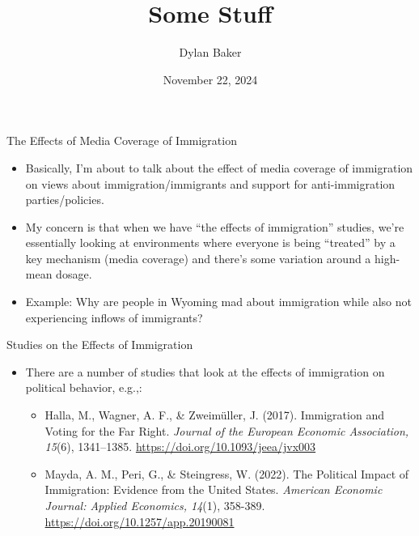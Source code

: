 \documentclass[12pt, aspectratio=169]{beamer}
\begin{document}
\title{Some Stuff}
\author{Dylan Baker}
\date{November 22, 2024}

\begin{frame} 

\maketitle

\end{frame}

\begin{frame}{The Effects of Media Coverage of Immigration}

    \begin{itemize}
        \item Basically, I'm about to talk about the effect of media coverage of immigration on 
            views about immigration/immigrants and support for anti-immigration parties/policies.
        \item My concern is that when we have ``the effects of immigration''
            studies, we're essentially looking at environments where everyone is
            being ``treated'' by a key mechanism (media coverage) and there's some variation around a high-mean dosage.
        \item Example: Why are people in Wyoming mad about immigration while also not experiencing inflows of immigrants?
    \end{itemize}
    
    
\end{frame}


\begin{frame}{Studies on the Effects of Immigration}

\begin{itemize}
\item There are a number of studies that look at the effects of immigration on 
    political behavior, e.g.,:
    \begin{itemize}
        \item Halla, M., Wagner, A. F., \& Zweimüller, J. (2017). Immigration and Voting for the Far Right. \emph{Journal of the European Economic Association, 15}(6), 1341–1385. \href{https://doi.org/10.1093/jeea/jvx003}{https://doi.org/10.1093/jeea/jvx003}
        \item Mayda, A. M., Peri, G., \& Steingress, W. (2022). The Political Impact of Immigration: Evidence from the United States. \emph{American Economic Journal: Applied Economics, 14}(1), 358-389. \href{https://doi.org/10.1257/app.20190081}{https://doi.org/10.1257/app.20190081}
    \end{itemize}    
\end{itemize}

\end{frame}
\end{document}
